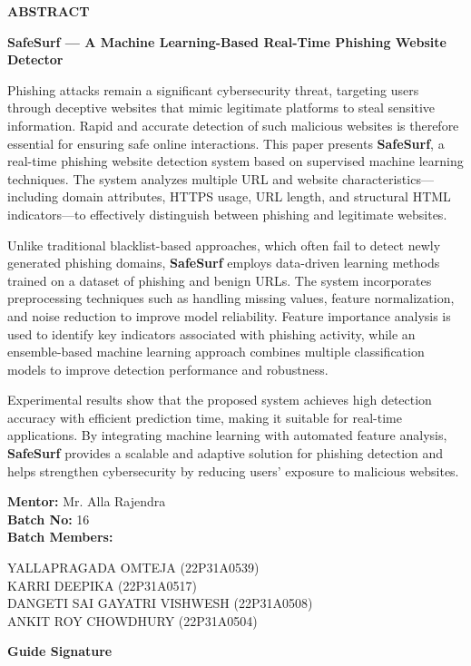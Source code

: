 \begin{center}
\textbf{\Large ABSTRACT}
\end{center}

\vspace{0.5cm}

\noindent
\textbf{SafeSurf — A Machine Learning-Based Real-Time Phishing Website Detector}

\vspace{0.5cm}

\noindent
Phishing attacks remain a significant cybersecurity threat, targeting users through deceptive websites that mimic legitimate platforms to steal sensitive information. Rapid and accurate detection of such malicious websites is therefore essential for ensuring safe online interactions. This paper presents \textbf{SafeSurf}, a real-time phishing website detection system based on supervised machine learning techniques. The system analyzes multiple URL and website characteristics—including domain attributes, HTTPS usage, URL length, and structural HTML indicators—to effectively distinguish between phishing and legitimate websites.

\vspace{0.3cm}

\noindent
Unlike traditional blacklist-based approaches, which often fail to detect newly generated phishing domains, \textbf{SafeSurf} employs data-driven learning methods trained on a dataset of phishing and benign URLs. The system incorporates preprocessing techniques such as handling missing values, feature normalization, and noise reduction to improve model reliability. Feature importance analysis is used to identify key indicators associated with phishing activity, while an ensemble-based machine learning approach combines multiple classification models to improve detection performance and robustness.

\vspace{0.3cm}

\noindent
Experimental results show that the proposed system achieves high detection accuracy with efficient prediction time, making it suitable for real-time applications. By integrating machine learning with automated feature analysis, \textbf{SafeSurf} provides a scalable and adaptive solution for phishing detection and helps strengthen cybersecurity by reducing users’ exposure to malicious websites.

\vspace{1cm}

\noindent
\textbf{Mentor:} Mr. Alla Rajendra\\
\textbf{Batch No:} 16\\
\textbf{Batch Members:}

\vspace{0.2cm}

\noindent
YALLAPRAGADA OMTEJA (22P31A0539)\\
KARRI DEEPIKA (22P31A0517)\\
DANGETI SAI GAYATRI VISHWESH (22P31A0508)\\
ANKIT ROY CHOWDHURY (22P31A0504)

\vspace{1.5cm}

\begin{flushright}
\textbf{Guide Signature}
\end{flushright}